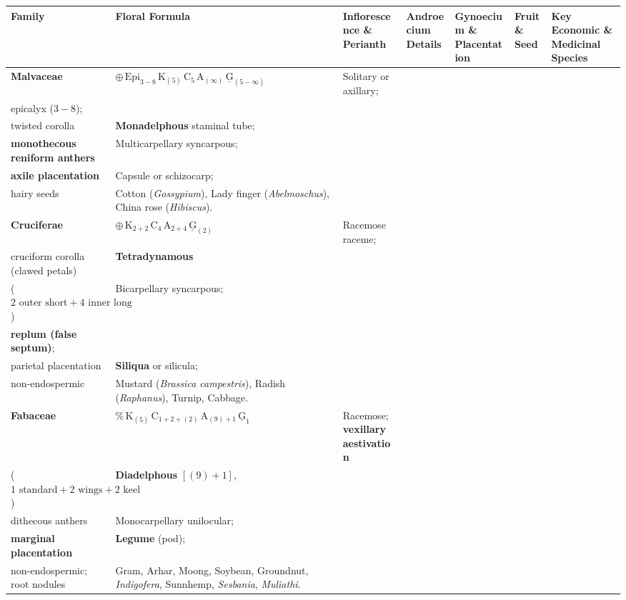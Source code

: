 \documentclass[10pt,twoside,openright]{book}
\begin{document}
\begin{landscape}
\begin{table}[p]
\centering
\fontsize{6.0pt}{7.5pt}\selectfont
\setlength{\tabcolsep}{2pt}
\renewcommand{\arraystretch}{1.0}
\begin{tabularx}{\linewidth}{@{}l >{\RaggedRight}p{3.8cm} >{\RaggedRight}p{2.0cm} >{\RaggedRight}p{2.0cm} >{\RaggedRight}p{2.0cm} >{\RaggedRight}p{1.8cm} >{\RaggedRight}X@{}}
\toprule
\textbf{Family} & \textbf{Floral Formula} & \textbf{Inflorescence \& Perianth} & \textbf{Androecium Details} & \textbf{Gynoecium \& Placentation} & \textbf{Fruit \& Seed} & \textbf{Key Economic \& Medicinal Species} \\
\midrule
\textbf{Malvaceae} & $\oplus\,\text{Epi}_{3-8}\,\text{K}_{(5)}\,\text{C}_5\,\text{A}_{(\infty)}\,\underline{\text{G}}_{(5-\infty)}$ & Solitary or axillary;\\epicalyx ($3-8$);\\twisted corolla & \textbf{Monadelphous} staminal tube;\\\textbf{monothecous reniform anthers} & Multicarpellary syncarpous;\\\textbf{axile placentation} & Capsule or schizocarp;\\hairy seeds & Cotton (\textit{Gossypium}), Lady finger (\textit{Abelmoschus}), China rose (\textit{Hibiscus}). \\
\textbf{Cruciferae} & $\oplus\,\text{K}_{2+2}\,\text{C}_{4}\,\text{A}_{2+4}\,\underline{\text{G}}_{(2)}$ & Racemose raceme;\\cruciform corolla (clawed petals) & \textbf{Tetradynamous}\\($2\text{ outer short} + 4\text{ inner long}$) & Bicarpellary syncarpous;\\\textbf{replum (false septum)};\\parietal placentation & \textbf{Siliqua} or silicula;\\non-endospermic & Mustard (\textit{Brassica campestris}), Radish (\textit{Raphanus}), Turnip, Cabbage. \\
\textbf{Fabaceae} & $\%\,\text{K}_{(5)}\,\text{C}_{1+2+(2)}\,\text{A}_{(9)+1}\,\underline{\text{G}}_1$ & Racemose; \textbf{vexillary aestivation}\\($1\text{ standard} + 2\text{ wings} + 2\text{ keel}$) & \textbf{Diadelphous} $[(9)+1]$,\\dithecous anthers & Monocarpellary unilocular;\\\textbf{marginal placentation} & \textbf{Legume} (pod);\\non-endospermic; root nodules & Gram, Arhar, Moong, Soybean, Groundnut, \textit{Indigofera}, Sunnhemp, \textit{Sesbania}, \textit{Muliathi}. \\

\end{tabularx}
\end{table}
\end{landscape}
\end{document}
